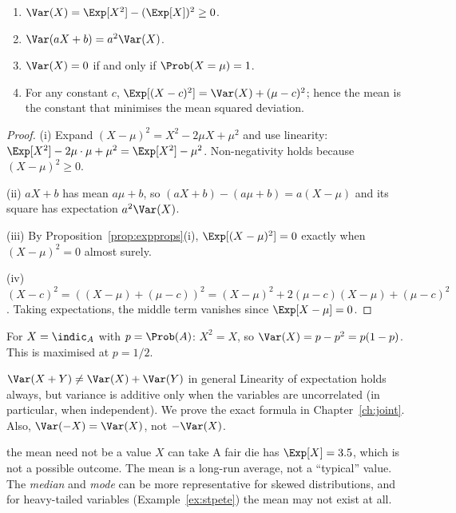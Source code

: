 \begin{proposition}\label{prop:var}
\begin{enumerate}[label=(\roman*)]
\item $\Var(X)=\Exp[X^2]-(\Exp[X])^2\ge0$.
\item $\Var(aX+b)=a^2\Var(X)$.
\item $\Var(X)=0$ if and only if $\Prob(X=\mu)=1$.
\item For any constant $c$, $\Exp[(X-c)^2]=\Var(X)+(\mu-c)^2$; hence the mean is
the constant that minimises the mean squared deviation.
\end{enumerate}
\end{proposition}
\begin{proof}
(i) Expand $(X-\mu)^2=X^2-2\mu X+\mu^2$ and use linearity:
$\Exp[X^2]-2\mu\cdot\mu+\mu^2=\Exp[X^2]-\mu^2$. Non-negativity holds because
$(X-\mu)^2\ge0$.

(ii) $aX+b$ has mean $a\mu+b$, so $(aX+b)-(a\mu+b)=a(X-\mu)$ and its square has
expectation $a^2\Var(X)$.

(iii) By Proposition~\ref{prop:expprops}(i), $\Exp[(X-\mu)^2]=0$ exactly when
$(X-\mu)^2=0$ almost surely.

(iv) $(X-c)^2=((X-\mu)+(\mu-c))^2=(X-\mu)^2+2(\mu-c)(X-\mu)+(\mu-c)^2$. Taking
expectations, the middle term vanishes since $\Exp[X-\mu]=0$.
\end{proof}

\begin{example}
For $X=\indic_A$ with $p=\Prob(A)$: $X^2=X$, so $\Var(X)=p-p^2=p(1-p)$. This is
maximised at $p=1/2$.
\end{example}

\begin{pitfall}{$\Var(X+Y)\ne\Var(X)+\Var(Y)$ in general}
Linearity of expectation holds always, but variance is additive only when the
variables are uncorrelated (in particular, when independent). We prove the exact
formula in Chapter~\ref{ch:joint}. Also, $\Var(-X)=\Var(X)$, not $-\Var(X)$.
\end{pitfall}

\begin{nuance}{the mean need not be a value $X$ can take}
A fair die has $\Exp[X]=3.5$, which is not a possible outcome. The mean is a
long-run average, not a ``typical'' value. The \emph{median} and \emph{mode} can
be more representative for skewed distributions, and for heavy-tailed variables
(Example~\ref{ex:stpete}) the mean may not exist at all.
\end{nuance}

